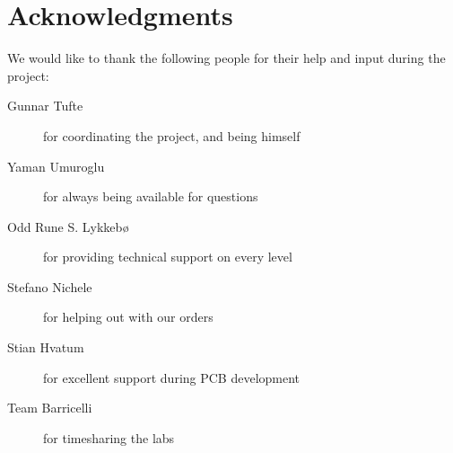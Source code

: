 \section*{Acknowledgments}
We would like to thank the following people for their help and input during the
project:

\begin{description}
  \item[Gunnar Tufte] for coordinating the project, and being himself
  \item[Yaman Umuroglu] for always being available for questions
  \item[Odd Rune S. Lykkebø] for providing technical support on every level
  \item[Stefano Nichele] for helping out with our orders
  \item[Stian Hvatum] for excellent support during PCB development
  \item[Team Barricelli] for timesharing the labs
\end{description}
\newpage
